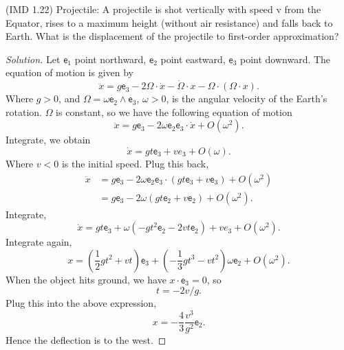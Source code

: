 
\begin{problem}
	(IMD 1.22)
	Projectile: A projectile is shot vertically with speed v from the Equator, rises to a maximum height (without air resistance) and falls back to Earth. What is the displacement of the projectile to first-order approximation?
\end{problem}
\begin{proof}[Solution]
	Let $\mathsf{e}_1$ point northward, $\mathsf{e}_2$ point eastward, $\mathsf{e}_3$ point downward. The equation of motion is given by
	\[
		\ddot{x} = g \mathsf{e}_3 - 2 \Omega \cdot \dot{x} - \dot{\Omega} \cdot x - \Omega \cdot (\Omega \cdot x)
	.\] 
	Where $g > 0$, and $\Omega = \omega \mathsf{e}_2 \wedge \mathsf{e}_3$, $\omega>0$, is the angular velocity of the Earth's rotation. $\Omega$ is constant, so we have the following equation of motion
	\[
		\ddot{x} = g \mathsf{e}_3 - 2 \omega \mathsf{e}_2 \mathsf{e}_3 \cdot \dot{x} 
		+ O(\omega^2)
	.\] 
	Integrate, we obtain
	\[
		\dot{x} = g t \mathsf{e}_3 + v e_3 + O(\omega)
	.\] 
	Where $v < 0$ is the initial speed. Plug this back,
	\begin{align*}
		\ddot{x} &= g \mathsf{e}_3 - 2 \omega \mathsf{e}_2 \mathsf{e}_3 \cdot \left( g t \mathsf{e}_3 + v \mathsf{e}_3 \right)  + O(\omega^2)\\
		&= g \mathsf{e}_3 - 2 \omega \left( g t \mathsf{e}_2 + v \mathsf{e}_2 \right) + O(\omega^2)
	.\end{align*} 
	Integrate,
	\[
		\dot{x} = g t \mathsf{e}_3 + \omega\left( - g t^2 \mathsf{e}_2 - 2 v t \mathsf{e}_2 \right) + v e_3 + O(\omega^2)
	.\] 
	Integrate again,
	\[
		x = \left( \frac{1}{2} g t^2 + v t  \right) \mathsf{e}_3 + \left( - \frac{1}{3} g t^3 -  v t^2 \right) \omega \mathsf{e}_2 + O(\omega^2)
	.\]
	When the object hits ground, we have  $x \cdot  \mathsf{e}_3 = 0$, so 
	\[
		t = -2 v / g
	.\] 
	Plug this into the above expression,
	\[
		x = - \frac{4}{3} \frac{v^3}{g^2} \mathsf{e}_2
	.\] 
	Hence the deflection is to the west.

\end{proof}


